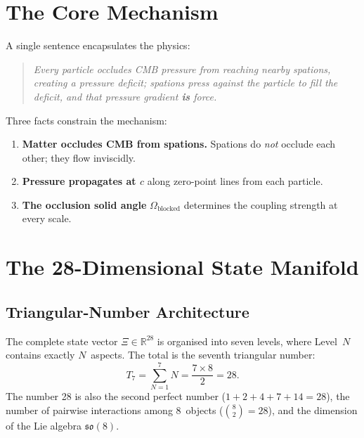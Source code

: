 \section{The Core Mechanism}

A single sentence encapsulates the physics:

\begin{quote}
\emph{Every particle occludes CMB pressure from reaching nearby spations, creating a pressure deficit; spations press against the particle to fill the deficit, and that pressure gradient \textbf{is} force.}
\end{quote}

\noindent Three facts constrain the mechanism:
\begin{enumerate}
  \item \textbf{Matter occludes CMB from spations.}  Spations do \emph{not} occlude each other; they flow inviscidly.
  \item \textbf{Pressure propagates at $c$} along zero-point lines from each particle.
  \item \textbf{The occlusion solid angle} $\Omega_{\text{blocked}}$ determines the coupling strength at every scale.
\end{enumerate}


\section{The 28-Dimensional State Manifold}

\subsection{Triangular-Number Architecture}

The complete state vector $\Xi \in \mathbb{R}^{28}$ is organised into seven levels, where Level~$N$ contains exactly $N$~aspects.  The total is the seventh triangular number:
\begin{equation}
  T_7 = \sum_{N=1}^{7} N = \frac{7 \times 8}{2} = 28.
\end{equation}
The number 28 is also the second perfect number ($1{+}2{+}4{+}7{+}14=28$), the number of pairwise interactions among 8~objects ($\binom{8}{2}=28$), and the dimension of the Lie algebra $\mathfrak{so}(8)$.


